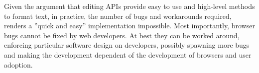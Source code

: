 %
%

Given the argument that editing APIs provide easy to use and high-level methods to format text, in practice, the number of bugs and workarounds required, renders a ''quick and easy'' implementation impossible. Most importantly, browser bugs cannot be fixed by web developers. At best they can be worked around, enforcing particular software design on developers, possibly spawning more bugs and making the development dependent of the development of browsers and user adoption.